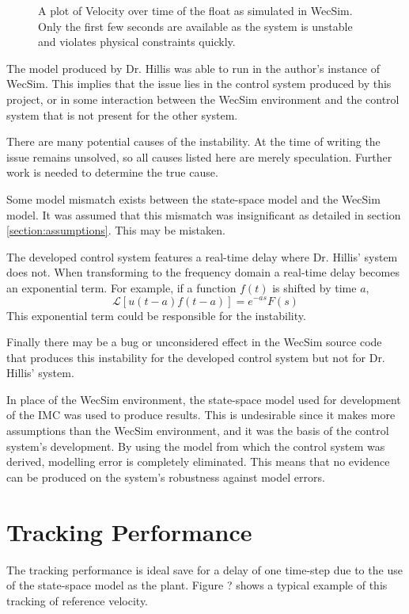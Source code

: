 \documentclass{report}
\begin{document}
\begin{figure}
\label{wecsimUnstable}
\caption{A plot of Velocity over time of the float as simulated in WecSim. Only the first few seconds are available as the system is unstable and violates physical constraints quickly.}
\end{figure} 

The model produced by Dr. Hillis was able to run in the author's instance of WecSim. This implies that the issue lies in the control system produced by this project, or in some interaction between the WecSim environment and the control system that is not present for the other system.

There are many potential causes of the instability. At the time of writing the issue remains unsolved, so all causes listed here are merely speculation. Further work is needed to determine the true cause. 

Some model mismatch exists between the state-space model and the WecSim model. It was assumed that this mismatch was insignificant as detailed in section \ref{section:assumptions}. This may be mistaken.

The developed control system features a real-time delay where Dr. Hillis' system does not. When transforming to the frequency domain a real-time delay becomes an exponential term. For example, if a function $f(t)$ is shifted by time $a$,
\[
\mathcal{L}[u(t-a)f(t-a)]=e^{-as}F(s)
\]
This exponential term could be responsible for the instability.

Finally there may be a bug or unconsidered effect in the WecSim source code that produces this instability for the developed control system but not for Dr. Hillis' system.

In place of the WecSim environment, the state-space model used for development of the IMC was used to produce results. This is undesirable since it makes more assumptions than the WecSim environment, and it was the basis of the control system's development. By using the model from which the control system was derived, modelling error is completely eliminated. This means that no evidence can be produced on the system's robustness against model errors.

\section{Tracking Performance}
The tracking performance is ideal save for a delay of one time-step due to the use of the state-space model as the plant. Figure ? shows a typical example of this tracking of reference velocity.
\end{document}
